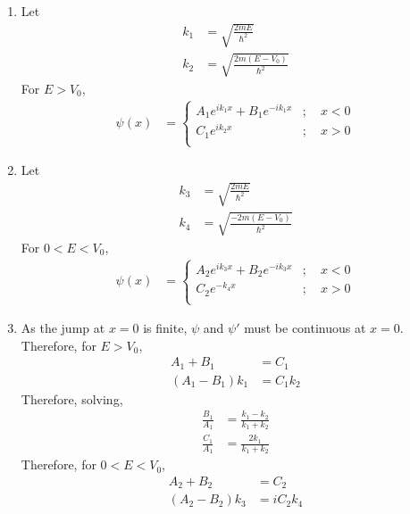 \documentclass[fleqn, a4paper, 11pt, oneside]{amsart}
\theoremstyle{definition}
\theoremstyle{theorem}
\begin{document}
\begin{solution}
	\begin{enumerate}[leftmargin=*]
		\item
			Let
			\begin{align*}
				k_1 & = \sqrt{\frac{2 m E}{\hbar^2}} \\
				k_2 & = \sqrt{\frac{2 m (E - V_0)}{\hbar^2}}
			\end{align*}
			For $E > V_0$,
			\begin{align*}
				\psi(x) &=
					\begin{cases}
						A_1 e^{i k_1 x} + B_1 e^{-i k_1 x} & ;\quad x < 0 \\
						C_1 e^{i k_2 x}                    & ;\quad x > 0 \\
					\end{cases}
			\end{align*}
		\item
			Let
			\begin{align*}
				k_3 & = \sqrt{\frac{2 m E}{\hbar^2}} \\
				k_4 & = \sqrt{\frac{-2 m (E - V_0)}{\hbar^2}}
			\end{align*}
			For $0 < E < V_0$,
			\begin{align*}
				\psi(x) &=
					\begin{cases}
						A_2 e^{i k_3 x} + B_2 e^{-i k_3 x} & ;\quad x < 0 \\
						C_2 e^{-k_4 x}                     & ;\quad x > 0 \\
					\end{cases}
			\end{align*}
		\item
			As the jump at $x = 0$ is finite, $\psi$ and $\psi'$ must be continuous at $x = 0$.\\
			Therefore, for $E > V_0$,
			\begin{align*}
				A_1 + B_1       & = C_1 \\
				(A_1 - B_1) k_1 & = C_1 k_2
			\end{align*}
			Therefore, solving,
			\begin{align*}
				\frac{B_1}{A_1} & = \frac{k_1 - k_2}{k_1 + k_2} \\
				\frac{C_1}{A_1} & = \frac{2 k_1}{k_1 + k_2}
			\end{align*}
			Therefore, for $0 < E < V_0$,
			\begin{align*}
				A_2 + B_2       & = C_2 \\
				(A_2 - B_2) k_3 & = i C_2 k_4
			\end{align*}

\end{enumerate}
\end{solution}
\end{document}
